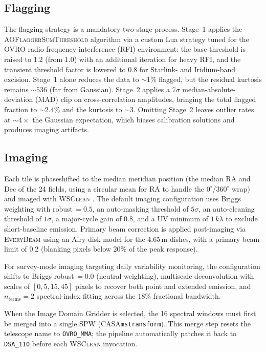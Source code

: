 \documentclass[twocolumn,11pt]{article}
\newcommand{\wsclean}{\textsc{WSClean}\xspace}
\newcommand{\casa}{\textsc{CASA}\xspace}
\newcommand{\everybeam}{\textsc{EveryBeam}\xspace}
\newcommand{\aoflagger}{\textsc{AOFlagger}\xspace}
\begin{document}
\subsection{Flagging}\label{sec:flagging}

The flagging strategy is a mandatory two-stage process.  Stage~1 applies
the \aoflagger \textsc{SumThreshold} algorithm via a custom Lua
strategy tuned for the OVRO radio-frequency interference (RFI)
environment: the base threshold is raised to 1.2 (from 1.0) with an
additional iteration for heavy RFI, and the transient threshold factor
is lowered to 0.8 for Starlink- and Iridium-band excision.  Stage~1
alone reduces the data to $\sim\!1\%$ flagged, but the residual kurtosis
remains $\sim\!536$ (far from Gaussian).  Stage~2 applies a $7\sigma$
median-absolute-deviation (MAD) clip on cross-correlation amplitudes,
bringing the total flagged fraction to $\sim\!2.4\%$ and the kurtosis
to $\sim\!3$.  Omitting Stage~2 leaves outlier rates at $\sim\!4\times$
the Gaussian expectation, which biases calibration solutions and
produces imaging artifacts.

\subsection{Imaging}\label{sec:imaging}

Each tile is phaseshifted to the median meridian position (the median RA
and Dec of the 24 fields, using a circular mean for RA to handle the
$0^{\circ}/360^{\circ}$ wrap) and imaged with \wsclean
\citep{offringa2014}.  The default imaging configuration uses Briggs
weighting with robust$\,=0.5$, an auto-masking threshold of $5\sigma$,
an auto-cleaning threshold of $1\sigma$, a major-cycle gain of 0.8, and
a UV minimum of $1\,k\lambda$ to exclude short-baseline emission.
Primary beam correction is applied post-imaging via \everybeam using an
Airy-disk model for the 4.65\,m dishes, with a primary beam limit of
0.2 (blanking pixels below 20\% of the peak response).

For survey-mode imaging targeting daily variability monitoring, the
configuration shifts to Briggs robust$\,=0.0$ (neutral weighting),
multiscale deconvolution with scales of $[0, 5, 15, 45]$ pixels to
recover both point and extended emission, and $n_{\mathrm{terms}}=2$
spectral-index fitting across the 18\% fractional bandwidth.

When the Image Domain Gridder \citep[IDG;][]{vandertol2018} is
selected, the 16 spectral windows must first be merged into a single SPW
(\casa \texttt{mstransform}).  This merge step resets the telescope name
to \texttt{OVRO\_MMA}; the pipeline automatically patches it back to
\texttt{DSA\_110} before each \wsclean invocation.
\end{document}
